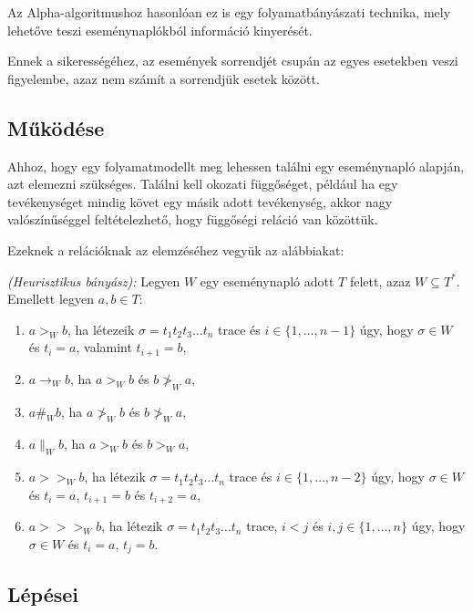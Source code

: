 
Az Alpha-algoritmushoz hasonlóan ez is egy folyamatbányászati technika, mely lehetőve teszi eseménynaplókból információ kinyerését.

Ennek a sikerességéhez, az események sorrendjét csupán az egyes esetekben veszi figyelembe, azaz nem számít a sorrendjük esetek között.

\subsection{Működése}

Ahhoz, hogy egy folyamatmodellt meg lehessen találni egy eseménynapló alapján, azt elemezni szükséges. Találni kell okozati függőséget, például ha egy tevékenységet mindig követ egy másik adott tevékenység, akkor nagy valószínűséggel feltételezhető, hogy függőségi reláció van közöttük. 

Ezeknek a relációknak az elemzéséhez vegyük az alábbiakat:

\begin{definition}{\textit{(Heurisztikus bányász):}} Legyen $W$ egy eseménynapló adott $T$ felett, azaz $W \subseteq T^*$. Emellett legyen $a,b \in T:$
\begin{enumerate}

\item $ a>_W b $, ha létezeik $\sigma = t_1 t_2 t_3 \ldots t_n $ trace és $i \in \{1, \ldots ,n-1\}$ úgy, hogy $\sigma \in W$ és $t_i=a$, valamint $t_{i+1}=b$,
\item $ a \rightarrow_W b $, ha $a>_W b$ és $b\ngtr_W a$, 
\item $ a\#_Wb $, ha $a \ngtr_W b$ és $b\ngtr_W a$,
\item $a\parallel_Wb $, ha $a>_W b$ és $b>_Wa$,
\item $a >>_Wb$, ha létezik $\sigma = t_1 t_2 t_3 \ldots t_n $ trace és $i \in \{1, \ldots ,n-2\}$ úgy, hogy $\sigma \in W$ és $t_i=a$, $t_{i+1}=b$ és $t_{i+2}=a$,
\item $a>>>_Wb$, ha létezik $\sigma = t_1 t_2 t_3 \ldots t_n $ trace, $i<j$ és $i,j \in \{1,\ldots,n\}$ úgy, hogy $\sigma \in W$ és $t_i=a$, $t_j=b$.

\end{enumerate}
\end{definition}

\subsection{Lépései}


